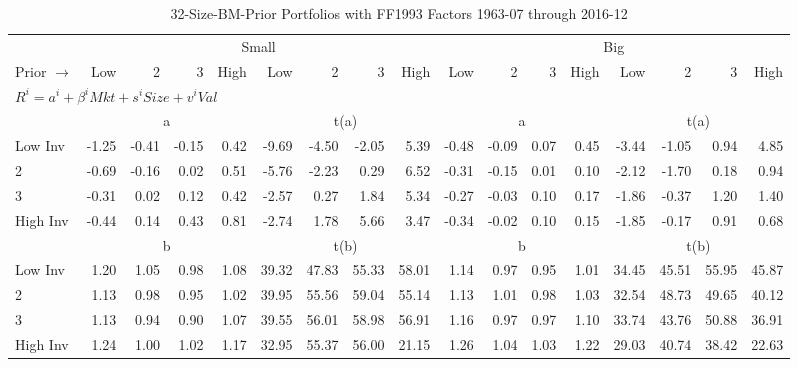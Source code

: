 
\begin{table}[!ht]
\footnotesize
\centering
\caption{32-Size-BM-Prior Portfolios with FF1993 Factors 1963-07 through 2016-12}
\begin{tabular}{lrrrrrrrrrrrrrrrr}
  \toprule
    & \multicolumn{8}{c}{Small} & \multicolumn{8}{c}{Big} \\
      \cmidrule(r){2-9} \cmidrule(r){10-17}
    Prior $\rightarrow$ & Low & 2 & 3 & High & Low & 2 & 3 & High & Low & 2 & 3 & High & Low & 2 & 3 & High \\ 
  \midrule
  \multicolumn{17}{l}{$R^i=a^i+\beta^iMkt+s^iSize+v^iVal$} \\

  
    
      & \multicolumn{4}{c}{a} & \multicolumn{4}{c}{t(a)}
    
      & \multicolumn{4}{c}{a} & \multicolumn{4}{c}{t(a)}
    
    \\
      \cmidrule(r){2-5} \cmidrule(r){6-9} \cmidrule(r){10-13} \cmidrule(r){14-17}

    Low Inv   & -1.25  & -0.41  & -0.15  & 0.42  & -9.69  & -4.50  & -2.05  & 5.39  & -0.48  & -0.09  & 0.07  & 0.45  & -3.44  & -1.05  & 0.94  & 4.85  \\
           2  & -0.69  & -0.16  & 0.02  & 0.51  & -5.76  & -2.23  & 0.29  & 6.52  & -0.31  & -0.15  & 0.01  & 0.10  & -2.12  & -1.70  & 0.18  & 0.94  \\
           3  & -0.31  & 0.02  & 0.12  & 0.42  & -2.57  & 0.27  & 1.84  & 5.34  & -0.27  & -0.03  & 0.10  & 0.17  & -1.86  & -0.37  & 1.20  & 1.40  \\
    High Inv  & -0.44  & 0.14  & 0.43  & 0.81  & -2.74  & 1.78  & 5.66  & 3.47  & -0.34  & -0.02  & 0.10  & 0.15  & -1.85  & -0.17  & 0.91  & 0.68  \\

  
    
      & \multicolumn{4}{c}{b} & \multicolumn{4}{c}{t(b)}
    
      & \multicolumn{4}{c}{b} & \multicolumn{4}{c}{t(b)}
    
    \\
      \cmidrule(r){2-5} \cmidrule(r){6-9} \cmidrule(r){10-13} \cmidrule(r){14-17}

    Low Inv   & 1.20  & 1.05  & 0.98  & 1.08  & 39.32  & 47.83  & 55.33  & 58.01  & 1.14  & 0.97  & 0.95  & 1.01  & 34.45  & 45.51  & 55.95  & 45.87  \\
           2  & 1.13  & 0.98  & 0.95  & 1.02  & 39.95  & 55.56  & 59.04  & 55.14  & 1.13  & 1.01  & 0.98  & 1.03  & 32.54  & 48.73  & 49.65  & 40.12  \\
           3  & 1.13  & 0.94  & 0.90  & 1.07  & 39.55  & 56.01  & 58.98  & 56.91  & 1.16  & 0.97  & 0.97  & 1.10  & 33.74  & 43.76  & 50.88  & 36.91  \\
    High Inv  & 1.24  & 1.00  & 1.02  & 1.17  & 32.95  & 55.37  & 56.00  & 21.15  & 1.26  & 1.04  & 1.03  & 1.22  & 29.03  & 40.74  & 38.42  & 22.63  \\


\end{tabular}
\end{table}

